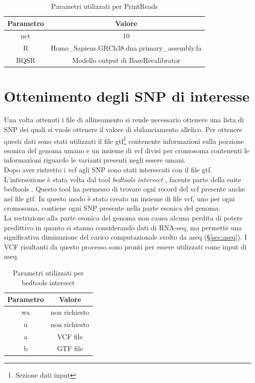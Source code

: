     \begin{table}[H]
        \centering
        \begin{tabular}{|c|c|}
                \hline
                Parametro & Valore\\
                \hline
                nct & $10$\\
                \hline
                R & Homo\_Sapiens.GRCh38.dna.primary\_assembly.fa\\
                \hline
                BQSR & Modello output di BaseRecalibrator\\
                \hline
         \end{tabular}
         \caption{Parametri utilizzati per PrintReads}
    \end{table}


  \section{Ottenimento degli SNP di interesse}
  Una volta ottenuti i file di allineamento si rende necessario ottenere una lista di SNP dei quali si vuole ottenere il valore di sbilanciamento allelico.
  Per ottenere questi dati sono stati utilizzati il file gtf\footnote{Sezione dati input} contenente informazioni sulla porzione esonica del genoma umano e un insieme di vcf divisi per cromosoma contenenti le informazioni riguardo le varianti presenti negli essere umani.\\
  Dopo aver ristretto i vcf agli SNP sono stati intersecati con il file gtf.
  L'intersezione \`e stata volta dal tool \emph{bedtools intersect} \cite{bedtoolsintersect}, facente parte della suite bedtools \cite{bedtools}.
  Questo tool ha permesso di trovare ogni record del vcf presente anche nel file gtf.
  In questo modo \`e stato creato un insieme di file vcf, uno per ogni cromosoma, contiene ogni SNP presente nella parte esonica del genoma.\\
  La restrizione alla parte esonica del genoma non causa alcuna perdita di potere predittivo in quanto si stanno considerando dati di RNA-seq, ma permette una significativa diminuzione del carico computazionale svolto da aseq (\S\ref{sec:aseq}).
  I VCF risultanti da questo processo sono pronti per essere utilizzati come input di aseq.
  \begin{table}[H]
        \centering
        \begin{tabular}{|c|c|}
                \hline
                Parametro & Valore\\
                \hline
                wa & non richiesto\\
                \hline
                u & non richiesto\\
                \hline
                a & VCF file\\
                \hline
                b & GTF file\\
                \hline
         \end{tabular}
         \caption{Parametri utilizzati per bedtools intersect}
  \end{table}

